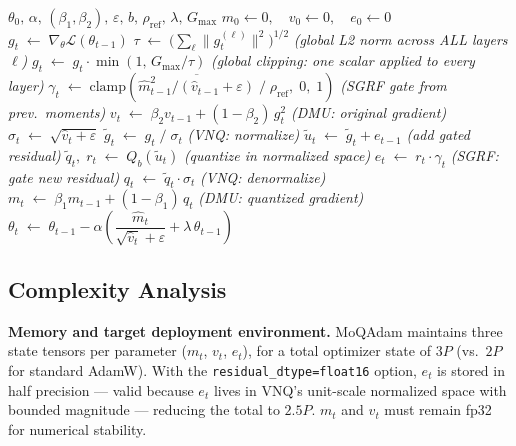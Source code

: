 \documentclass[10pt,twocolumn]{article}
\begin{document}
\begin{algorithm}[h]
\caption{MoQAdam}
\begin{algorithmic}[1]
\REQUIRE $\theta_0,\, \alpha,\, (\beta_1,\beta_2),\, \varepsilon,\,
         b,\, \rho_{\text{ref}},\, \lambda,\, G_{\max}$
\STATE $m_0 \leftarrow 0,\quad v_0 \leftarrow 0,\quad e_0 \leftarrow 0$
  \STATE $g_t \;\leftarrow\; \nabla_\theta\mathcal{L}(\theta_{t-1})$
  \STATE $\tau \;\leftarrow\; \bigl(\sum_\ell \|g_t^{(\ell)}\|^2\bigr)^{1/2}$
    \hfill \textit{(global L2 norm across ALL layers $\ell$)}
  \STATE $g_t \;\leftarrow\; g_t \cdot \min\!\left(1,\, G_{\max}/\tau\right)$
    \hfill \textit{(global clipping: one scalar applied to every layer)}
  \STATE $\gamma_t \;\leftarrow\;
    \mathrm{clamp}\!\left(\overline{\hat{m}_{t-1}^2 / (\hat{v}_{t-1}+\varepsilon)}
    \;/\;\rho_{\text{ref}},\;0,\;1\right)$
    \hfill \textit{(SGRF gate from prev.\ moments)}
  \STATE $v_t \;\leftarrow\; \beta_2 v_{t-1} + (1-\beta_2)\,g_t^2$
    \hfill \textit{(DMU: original gradient)}
  \STATE $\sigma_t \;\leftarrow\; \sqrt{\hat{v}_t + \varepsilon}$
  \STATE $\tilde{g}_t \;\leftarrow\; g_t \;/\; \sigma_t$
    \hfill \textit{(VNQ: normalize)}
  \STATE $\tilde{u}_t \;\leftarrow\; \tilde{g}_t + e_{t-1}$
    \hfill \textit{(add gated residual)}
  \STATE $\tilde{q}_t,\;r_t \;\leftarrow\; Q_b(\tilde{u}_t)$
    \hfill \textit{(quantize in normalized space)}
  \STATE $e_t \;\leftarrow\; r_t \cdot \gamma_t$
    \hfill \textit{(SGRF: gate new residual)}
  \STATE $q_t \;\leftarrow\; \tilde{q}_t \cdot \sigma_t$
    \hfill \textit{(VNQ: denormalize)}
  \STATE $m_t \;\leftarrow\; \beta_1 m_{t-1} + (1-\beta_1)\,q_t$
    \hfill \textit{(DMU: quantized gradient)}
  \STATE $\theta_t \;\leftarrow\; \theta_{t-1} - \alpha\!\left(
    \dfrac{\hat{m}_t}{\sqrt{\hat{v}_t}+\varepsilon}
    + \lambda\,\theta_{t-1}\right)$
\ENDFOR
\end{algorithmic}
\end{algorithm}

\subsection{Complexity Analysis}

\textbf{Memory and target deployment environment.}
MoQAdam maintains three state tensors per parameter ($m_t$, $v_t$, $e_t$),
for a total optimizer state of $3P$ (vs.\ $2P$ for standard AdamW).
With the \texttt{residual\_dtype=float16} option, $e_t$ is stored in
half precision — valid because $e_t$ lives in VNQ's unit-scale normalized
space with bounded magnitude — reducing the total to $2.5P$.
$m_t$ and $v_t$ must remain fp32 for numerical stability.
\end{document}
